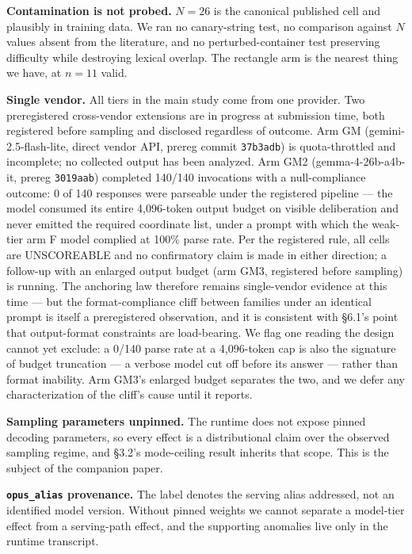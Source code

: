 \documentclass[11pt]{article}
\begin{document}
\textbf{Contamination is not probed.} $N = 26$ is the canonical published cell and plausibly in
training data. We ran no canary-string test, no comparison against $N$ values absent from the
literature, and no perturbed-container test preserving difficulty while destroying lexical
overlap. The rectangle arm is the nearest thing we have, at $n = 11$ valid.

\textbf{Single vendor.} All tiers in the main study come from one provider. Two preregistered
cross-vendor extensions are in progress at submission time, both registered before sampling and
disclosed regardless of outcome. Arm GM (gemini-2.5-flash-lite, direct vendor API,
prereg commit \texttt{37b3adb}) is quota-throttled and incomplete; no collected output has been
analyzed. Arm GM2 (gemma-4-26b-a4b-it, prereg \texttt{3019aab}) completed 140/140 invocations with a
null-compliance outcome: 0 of 140 responses were parseable under the registered pipeline ---
the model consumed its entire 4{,}096-token output budget on visible deliberation and never
emitted the required coordinate list, under a prompt with which the weak-tier arm F model
complied at 100\% parse rate. Per the registered rule, all cells are UNSCOREABLE and no
confirmatory claim is made in either direction; a follow-up with an enlarged output budget
(arm GM3, registered before sampling) is running. The anchoring law therefore remains
single-vendor evidence at this time --- but the format-compliance cliff between families under
an identical prompt is itself a preregistered observation, and it is consistent with \S6.1's
point that output-format constraints are load-bearing. We flag one reading the design cannot
yet exclude: a 0/140 parse rate at a 4{,}096-token cap is also the signature of budget
truncation --- a verbose model cut off before its answer --- rather than format inability. Arm
GM3's enlarged budget separates the two, and we defer any characterization of the cliff's
cause until it reports.

\textbf{Sampling parameters unpinned.} The runtime does not expose pinned decoding parameters, so
every effect is a distributional claim over the observed sampling regime, and \S3.2's
mode-ceiling result inherits that scope. This is the subject of the companion paper.

\textbf{\texttt{opus\_alias} provenance.} The label denotes the serving alias addressed, not an identified
model version. Without pinned weights we cannot separate a model-tier effect from a serving-path
effect, and the supporting anomalies live only in the runtime transcript.
\end{document}
